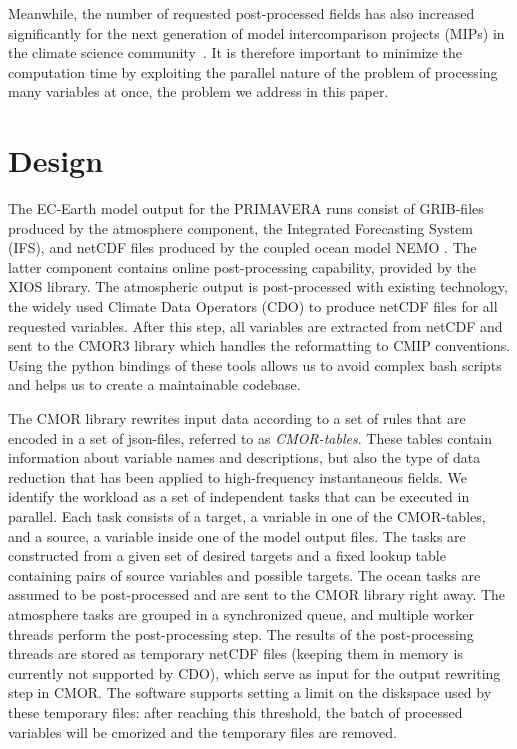 \documentclass[procedia]{easychair}
\begin{document}
Meanwhile, the number of requested post-processed fields has also increased significantly for the next generation of model intercomparison projects (MIPs) in the climate 
science community~\cite{eyri:2016b}.
It is therefore important to minimize the 
computation time by 
exploiting the parallel nature of the problem of processing many variables at 
once, the problem we address in this paper.


\section{Design}
The EC-Earth model output for the PRIMAVERA runs consist of GRIB-files produced 
by the atmosphere component, the Integrated Forecasting System (IFS), and 
netCDF files produced by the coupled ocean model NEMO \cite{NEMO}. The latter 
component 
contains online post-processing capability, provided by the XIOS library. The 
atmospheric output is post-processed with existing technology, the widely used 
Climate Data Operators (CDO) \cite{CDO} to produce netCDF files for all 
requested 
variables. After this step, all variables are extracted from netCDF and sent to 
the CMOR3 library \cite{CMOR} which handles the reformatting to CMIP 
conventions. Using the 
python bindings of these tools allows us to avoid complex bash scripts and 
helps us to create a maintainable codebase.

The CMOR library rewrites input data according to a set of rules that are 
encoded in a set of json-files, referred to as \emph{CMOR-tables}. These tables 
contain information about variable names and descriptions, but also the type of 
data reduction that has been applied to high-frequency instantaneous fields. We 
identify the workload as a set of independent tasks that can be executed in 
parallel. Each task consists of a target, a variable in one of the CMOR-tables, 
and a source, a variable inside one of the model output files. The tasks are 
constructed from a given set of desired targets and a fixed lookup table 
containing pairs of source variables and possible targets. The ocean tasks 
are assumed to be post-processed and are sent to the CMOR library right away. 
The atmosphere tasks are grouped in a synchronized queue, and multiple worker 
threads perform the post-processing step. The results of the post-processing 
threads are stored as temporary netCDF files (keeping them in memory is 
currently not supported by CDO), which serve as input for the output rewriting 
step in CMOR. The software supports setting a limit on the diskspace used by 
these temporary files: after reaching this threshold, the batch of processed 
variables will be cmorized and the temporary files are removed.
\end{document}
